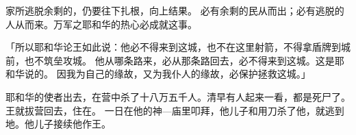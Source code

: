 {家所逃脱余剩的，仍要往下扎根，向上结果。
必有余剩的民从{}而出；必有逃脱的人从{}而来。万军之耶和华的热心必成就这事。
\par }{\PP {}「所以耶和华论{}王如此说：他必不得来到这城，也不在这里射箭，不得拿盾牌到城前，也不筑垒攻城。
他从哪条路来，必从那条路回去，必不得来到这城。这是耶和华说的。
因我为自己的缘故，又为我仆人{}的缘故，必保护拯救这城。」
\par }{\PP {}耶和华的使者出去，在{}营中杀了十八万五千人。清早有人起来一看，都是死尸了。
王{}就拔营回去，住在{}。
一日在他的神—{}庙里叩拜，他儿子{}和{}用刀杀了他，就逃到{}地。他儿子{}接续他作王。

}
